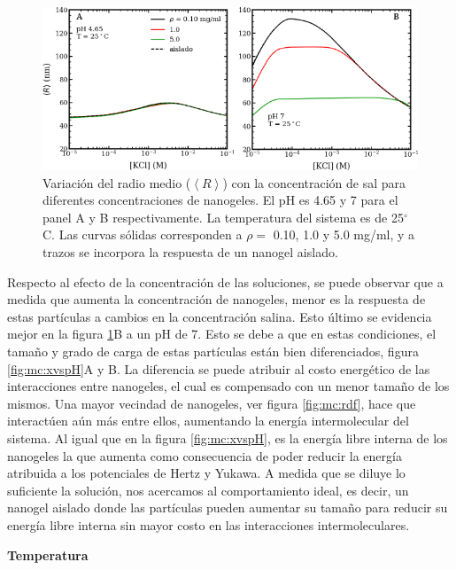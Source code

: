 	\begin{figure}
		\centering
		\includegraphics[width=0.75\linewidth]{Figures/graph-mc/r-salts-pHs.pdf}
		\caption{Variaci\'on del radio medio ($\left<R\right>$) con la concentraci\'on de sal para diferentes concentraciones de nanogeles. El pH es 4.65 y 7 para el panel A y B respectivamente. La temperatura del sistema es de 25$^\circ$C. Las curvas s\'olidas corresponden a $\rho=$ 0.10, 1.0 y 5.0 mg/ml, y a trazos se incorpora la respuesta de un nanogel aislado.}
		\label{fig:mc:reentrante}
	\end{figure}
	
	Respecto al efecto de la concentraci\'on de las soluciones, se puede observar que a medida que aumenta la concentraci\'on de nanogeles, menor es la respuesta de estas part\'iculas a cambios en la concentraci\'on salina. Esto \'ultimo se evidencia mejor en la figura \ref{fig:mc:reentrante}B a un pH de 7. Esto se debe a que en estas condiciones, el tama\~no y grado de carga de estas part\'iculas est\'an bien diferenciados, figura \ref{fig:mc:xvspH}A y B. La diferencia se puede atribuir al costo energ\'etico de las interacciones entre nanogeles, el cual es compensado con un menor tama\~no de los mismos. Una mayor vecindad de nanogeles, ver figura \ref{fig:mc:rdf}, hace que interact\'uen a\'un m\'as entre ellos, aumentando la energ\'ia intermolecular del sistema. Al igual que en la figura \ref{fig:mc:xvspH}, es la energ\'ia libre interna de los nanogeles la que aumenta como consecuencia de poder reducir la energ\'ia atribuida a los potenciales de Hertz y Yukawa. A medida que se diluye lo suficiente la soluci\'on, nos acercamos al comportamiento ideal, es decir, un nanogel aislado donde las part\'iculas pueden aumentar su tama\~no para reducir su energ\'ia libre interna sin mayor costo en las interacciones intermoleculares.
	
	
	\textbf{Temperatura}

